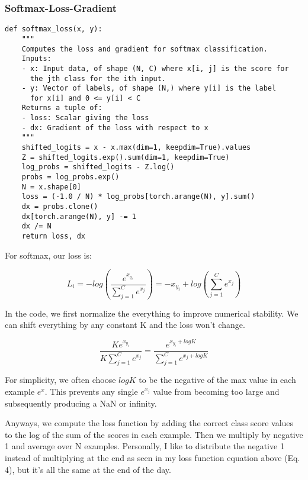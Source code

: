 \documentclass[12pt]{article}
\begin{document}
\paragraph{}
\subsubsection{Softmax-Loss-Gradient}
\begin{verbatim}
def softmax_loss(x, y):
    """
    Computes the loss and gradient for softmax classification.
    Inputs:
    - x: Input data, of shape (N, C) where x[i, j] is the score for
      the jth class for the ith input.
    - y: Vector of labels, of shape (N,) where y[i] is the label
      for x[i] and 0 <= y[i] < C
    Returns a tuple of:
    - loss: Scalar giving the loss
    - dx: Gradient of the loss with respect to x
    """
    shifted_logits = x - x.max(dim=1, keepdim=True).values
    Z = shifted_logits.exp().sum(dim=1, keepdim=True)
    log_probs = shifted_logits - Z.log()
    probs = log_probs.exp()
    N = x.shape[0]
    loss = (-1.0 / N) * log_probs[torch.arange(N), y].sum()
    dx = probs.clone()
    dx[torch.arange(N), y] -= 1
    dx /= N
    return loss, dx
\end{verbatim}

For softmax, our loss is: 

\begin{equation}
    L_{i} = -log(\frac{e^{x_{y_{i}}}}{\sum_{j=1}^C e^{x_j}}) 
    = -x_{y_{i}} + log(\sum_{j=1}^C e^{x_{j}})
\end{equation}

In the code, we first normalize the everything to improve numerical stability. 
We can shift everything by any constant K and the loss won't change. 

\begin{equation}
    \frac{K e^{x_{y_{i}}}}{K \sum_{j=1}^C e^{x_j}} = 
    \frac{e^{x_{y_{i}} + logK}}{\sum_{j=1}^C e^{x_j + log K}} 
\end{equation}

For simplicity, we often choose $log K$ to be the negative of the max value in each example 
$e^x$. This prevents any single $e^{x_j}$ value from becoming too large
and subsequently producing a NaN or infinity. 

Anyways, we compute the loss function by adding the correct class score values
to the log of the sum of the scores in each example. Then we multiply by negative 1
and average over N examples. Personally, I like to distribute the negative 1 instead 
of multiplying at the end as seen in my loss function equation above (Eq. 4), but it's all
the same at the end of the day. 
\end{document}
